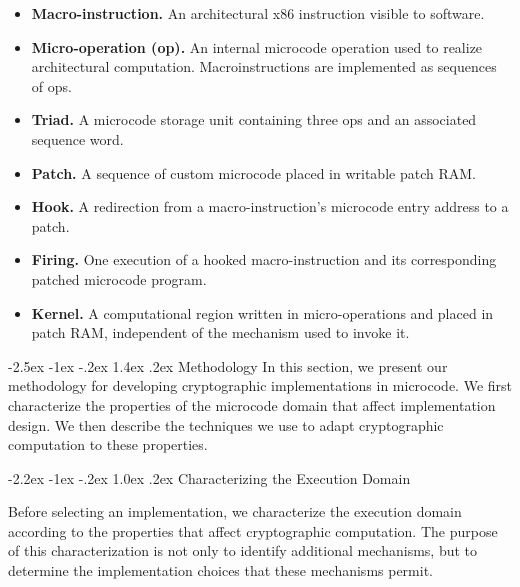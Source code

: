 \documentclass[journal=tches,submission]{iacrtrans}
\makeatletter
\renewcommand\section{\@startsection{section}{1}{\z@}%
      {-2.5ex \@plus -1ex \@minus -.2ex}%
      {1.4ex \@plus .2ex}%
      {\normalfont\Large\bfseries\SS@sectfont}}
\renewcommand\subsection{\@startsection{subsection}{2}{\z@}%
      {-2.2ex \@plus -1ex \@minus -.2ex}%
      {1.0ex \@plus .2ex}%
      {\normalfont\large\bfseries\SS@subsectfont}}
\makeatother
\begin{document}
\begin{itemize}[itemsep=2pt, parsep=0pt, topsep=1pt, partopsep=2pt]

\item
\textbf{Macro-instruction.}
An architectural x86 instruction visible to software.

\item
\textbf{Micro-operation (\textmu op).}
An internal microcode operation used to realize architectural computation.
Macroinstructions are implemented as sequences of \textmu ops.

\item
\textbf{Triad.}
A microcode storage unit containing three \textmu ops and an associated sequence word.

\item
\textbf{Patch.}
A sequence of custom microcode placed in writable patch RAM.

\item
\textbf{Hook.}
A redirection from a macro-instruction's microcode entry address to a patch.

\item
\textbf{Firing.}
One execution of a hooked macro-instruction and its corresponding patched microcode program.

\item
\textbf{Kernel.}
A computational region written in micro-operations and placed in patch RAM, independent of the mechanism used to invoke it.

\end{itemize}


\section{Methodology}
\label{sec:methodology}
In this section, we present our methodology for developing cryptographic implementations in microcode.
We first characterize the properties of the microcode domain that affect implementation design.
We then describe the techniques we use to adapt cryptographic computation to these properties.

\subsection{Characterizing the Execution Domain}
\label{sec:characterization}

Before selecting an implementation, we characterize the execution domain according to the properties that affect cryptographic computation.
The purpose of this characterization is not only to identify additional mechanisms, but to determine the implementation choices that these mechanisms permit.
\end{document}
